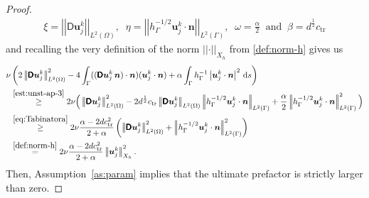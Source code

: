 \documentclass[reqno,a4paper]{amsart}
\def\abs#1{\left| #1 \right|}
\def\norm#1{\left|\!\left| #1 \right|\!\right|}
\def\tens#1{\pmb{\mathsf{#1}}}
\def\vec#1{\boldsymbol{#1}}
\def\d{{\rm d}}
\def\ds{\,\d s}
\def\Du{\BD\bu}
\def\bn{\vec{n}}
\def\bu{\vec{u}}
\def\BD{\tens{D}}
\begin{document}
\begin{proof}
\begin{align*}
		\xi=\norm{\Du^k_j }_{L^2(\Omega)},\;\;\eta=\norm{h_{\Gamma}^{-1/2} \bu^k_j \cdot \bn}_{L^2(\Gamma)},\;\;\omega=\frac{\alpha}{2}\;\;\text{and}\;\;\beta=d^{\frac{1}{2}}c_{\mathrm{tr}}
	\end{align*}
	and recalling the very definition of the norm $\norm{\cdot}_{X_h}$ from \eqref{def:norm-h} gives us
	\begin{equation}
		\begin{aligned}
			\label{est:unst-ap-4}
			\nu & \left(	2\norm{\Du^k_j}_{L^2(\Omega)}^2    - 4 \int_{\Gamma } ((\Du^k_j \, \bn)\cdot \bn) (\bu^k_j \cdot \bn) + \alpha \int_{\Gamma}h_{\Gamma}^{-1} \abs{\bu^k_j \cdot \bn}^2 \ds\right) \\ & \stackrel{\eqref{est:unst-ap-3}}{\geq}  2\nu\Big(\norm{\Du^k_j }_{L^2(\Omega)}^{2}-2d^{\frac{1}{2}}c_{\mathrm{tr}}\norm{\Du^k_j }_{L^2(\Omega)} \norm{h_{\Gamma}^{-1/2} \bu^k_j \cdot \bn}_{L^2(\Gamma)} + \frac{\alpha}{2}\norm{h_{\Gamma}^{-1/2} \bu^k_j \cdot \bn}_{L^2(\Gamma)} ^{2}\Big)\\ 
			& \stackrel{\eqref{eq:Tabinatora}}{\geq} 
			2 \nu \frac{\alpha -2dc_{\mathrm{tr}}^2 }{2 + \alpha} 
			\left( \norm{\Du^k_j}_{L^2(\Omega)}^2 + \norm{h_{\Gamma}^{-1/2}\bu^k_j \cdot \bn}_{L^2(\Gamma)}^2
			\right) \\ &
			\stackrel{\eqref{def:norm-h}}{=}  2 \nu \frac{\alpha -2dc_{\mathrm{tr}}^2 }{2 + \alpha} 
			\norm{\bu^k_j}_{X_h}^2. 
		\end{aligned}
	\end{equation}
	Then, Assumption~\ref{as:param} implies that the ultimate prefactor is strictly larger than zero. 
	

\end{proof}
\end{document}
